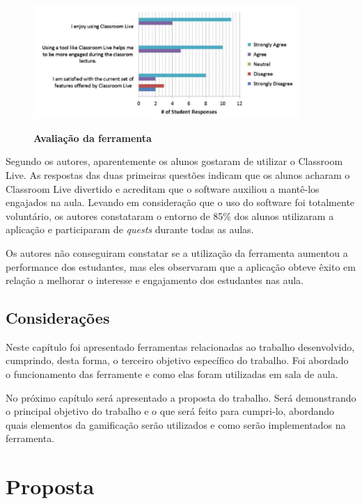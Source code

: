 \documentclass[
	12pt,				%
	oneside,			%
	a4paper,			%
	english,			%
	french,				%
	spanish,			%
	brazil,				%
	]{abntex2}
\begin{document}
\begin{figure}[ht]
\centering
\caption{\textbf{Avaliação da ferramenta}}
\includegraphics[width=0.9\textwidth]{imagens/classroom_avaliacao.png}
\label{fig:classroom_avaliacao}
\end{figure}

Segundo os autores, aparentemente os alunos gostaram de utilizar o Classroom Live. As respostas das duas primeiras questões indicam que os alunos acharam o Classroom Live divertido e acreditam que o software auxiliou a mantê-los engajados na aula. Levando em consideração que o uso do software foi totalmente voluntário, os autores constataram o entorno de 85\% dos alunos utilizaram a aplicação e participaram de \textit{quests} durante todas as aulas. 

Os autores não conseguiram constatar se a utilização da ferramenta aumentou a performance dos estudantes, mas eles observaram que a aplicação obteve êxito em relação a melhorar o interesse e engajamento dos estudantes nas aula.

\section{Considerações}
Neste capítulo foi apresentado ferramentas relacionadas ao trabalho desenvolvido, cumprindo, desta forma, o terceiro objetivo específico do trabalho. Foi abordado o funcionamento das ferramente e como elas foram utilizadas em sala de aula.

No próximo capítulo será apresentado a proposta do trabalho. Será demonstrando o principal objetivo do trabalho e o que será feito para cumpri-lo, abordando quais elementos da gamificação serão utilizados e como serão implementados na ferramenta.

\chapter{Proposta} 
\end{document}
